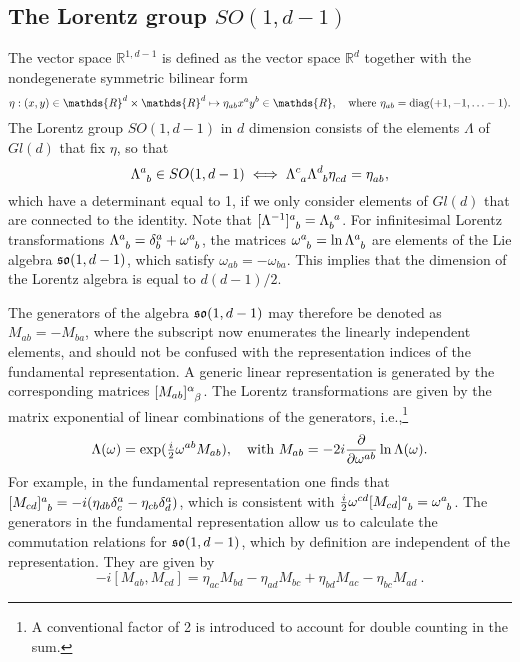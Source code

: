 \documentclass[
final,
11pt,
a4paper,
DIV=11,
headinclude=true,
footinclude=false,
bibliography=totoc,
twoside=true,  %
BCOR=5mm
]{scrbook}
\begin{document}
\newpage
\begin{subappendices}
\section{The Lorentz group $SO(1,d-1)$}
\label{sapp:Lorentz_group}

The vector space $\mathds{R}^{1,d-1}$ is defined as the vector 
space $\mathds{R}^d$ together with the nondegenerate symmetric 
bilinear form
\begin{equation*}
  \eta : (x,y) \in \mathds{R}^d \times \mathds{R}^d
  \mapsto \eta_{ab} x^a y^b \in \mathds{R},
  \quad\text{where~}
  \eta_{ab} = \mrm{diag}(+1, -1, \ldots -1).
\end{equation*}
The Lorentz group $SO(1,d-1)$ in $d$ dimension consists of the 
elements $\Lambda$ of $Gl(d)$ that fix $\eta$, so that
\begin{equation*}
  \Lambda\ind{^a_b} \in SO(1,d-1) \iff
  \Lambda\ind{^c_a} \Lambda\ind{^d_b} \eta\ind{_{cd}}
  = \eta\ind{_{ab}},
\end{equation*}
which have a determinant equal to 1, if we only consider elements 
of $Gl(d)$ that are connected to the identity. Note that 
$[\Lambda^{-1}]\ind{^a_b} = \Lambda\ind{_b^a}$. For infinitesimal 
Lorentz transformations $\Lambda\ind{^a_b} = \delta^a_b 
+ \omega\ind{^a_b}$, the matrices $\omega\ind{^a_b} = \ln 
\Lambda\ind{^a_b}$ are elements of the Lie algebra 
$\mathfrak{so}(1,d-1)$, which satisfy $\omega_{ab} = -\omega_{ba}$.  
This implies that the dimension of the Lorentz algebra is equal 
to $d(d-1)/2$.

The generators of the algebra $\mathfrak{so}(1,d-1)$ may therefore be 
denoted as $M_{ab} = -M_{ba}$, where the subscript now enumerates 
the linearly independent elements, and should not be confused 
with the representation indices of the fundamental 
representation. A generic linear representation is generated by 
the corresponding matrices $[M_{ab}]\ind{^\alpha_\beta}$.  The 
Lorentz transformations are given by the matrix exponential of 
linear combinations of the generators, i.e.,\footnote{A 
  conventional factor of 2 is introduced to account for double 
  counting in the sum.}
\begin{equation*}
  \Lambda(\omega) = \exp( \tfrac{i}{2}\omega^{ab} M_{ab}),
  \quad\text{with~}
  M_{ab} = -2i \frac{\partial}{\partial \omega^{ab}} \ln \Lambda(\omega).
\end{equation*}
For example, in the fundamental representation one finds that 
$[M_{cd}]\ind{^a_b} = -i(\eta_{db} \delta^a_c - \eta_{cb} 
\delta^a_d)$, which is consistent with $\tfrac{i}{2}\omega^{cd} 
[M_{cd}]\ind{^a_b} = \omega\ind{^a_b}$. The generators in the 
fundamental representation allow us to calculate the commutation 
relations for $\mathfrak{so}(1,d-1)$, which by definition are 
independent of the representation.  They are given by
\begin{equation}\label{eq:comm_rel_so(1,d)}
  -i[M_{ab},M_{cd}] = \eta_{ac}M_{bd} - \eta_{ad}M_{bc} + 
  \eta_{bd}M_{ac} - \eta_{bc}M_{ad}~.
\end{equation}


\end{subappendices}
\end{document}
